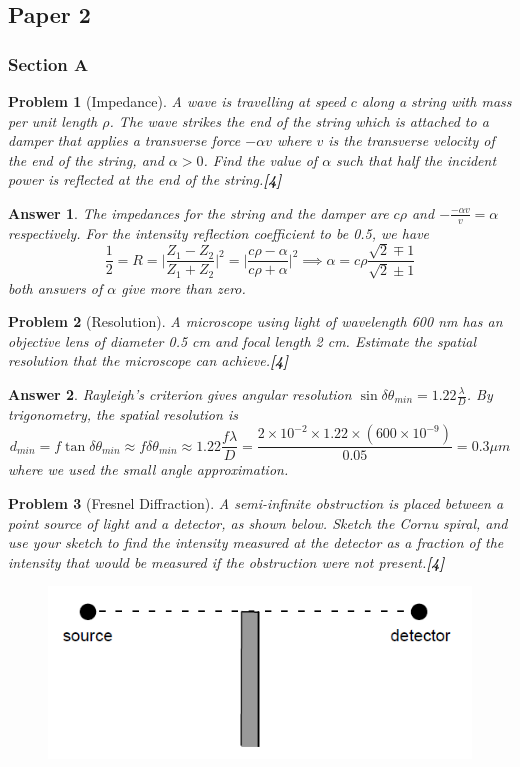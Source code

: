 \documentclass[a4paper]{article}
\newtheorem{ans}{Answer}[subsection]
\theoremstyle{new}
\newtheorem{qns}{Problem}[subsection]
\begin{document}
\subsection{Paper 2}
\subsubsection{Section A}
\begin{qns}[Impedance]
A wave is travelling at speed $c$ along a string with mass per unit length $\rho$. The wave strikes the end of the string which is attached to a damper that applies a transverse force $-\alpha v$ where $v$ is the transverse velocity of the end of the string, and $\alpha>0$. Find the value of $\alpha$ such that half the incident power is reflected at the end of the string.\hfill\textbf{[4]}
\end{qns}
\begin{ans}
The impedances for the string and the damper are $c\rho$ and $-\frac{-\alpha v}{v}=\alpha$ respectively. For the intensity reflection coefficient to be 0.5, we have
$$\frac{1}{2}=R=\bigg|\frac{Z_1-Z_2}{Z_1+Z_2}\bigg|^2=\bigg|\frac{c\rho-\alpha}{c\rho+\alpha}\bigg|^2\implies\alpha=c\rho\frac{\sqrt{2}\mp1}{\sqrt{2}\pm1}$$
both answers of $\alpha$ give more than zero.
\end{ans}
\begin{qns}[Resolution]
A microscope using light of wavelength 600 nm has an objective lens of diameter 0.5 cm and focal length 2 cm. Estimate the spatial resolution that the microscope can achieve.\hfill\textbf{[4]}
\end{qns}
\begin{ans}
Rayleigh's criterion gives angular resolution $\sin\delta\theta_{min}=1.22\frac{\lambda}{D}$. By trigonometry, the spatial resolution is $$d_{min}=f\tan\delta\theta_{min}\approx f\delta\theta_{min}\approx1.22\frac{f\lambda}{D}=\frac{2\times10^{-2}\times 1.22\times(600\times10^{-9})}{0.05}=0.3\mu m$$ where we used the small angle approximation.
\end{ans}
\begin{qns}[Fresnel Diffraction]
A semi-infinite obstruction is placed between a point source of light and a detector, as shown below. Sketch the Cornu spiral, and use your sketch to find the intensity measured at the detector as a fraction of the intensity that would be measured if the obstruction were not present.\hfill\textbf{[4]}
\begin{figure}[H]
    \centering
    \includegraphics[scale=0.5]{2017P2A3Q.PNG}
\end{figure}
\end{qns}
\end{document}
